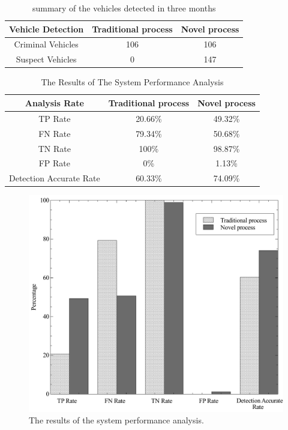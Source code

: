 \begin{table}[!t]
\renewcommand{\arraystretch}{1.2}
\caption{summary of the vehicles detected in three months}
\label{table_vehiclesDetected}
\centering
\begin{tabular}{c|c|c}
\hline
\bfseries Vehicle Detection & \bfseries Traditional process & \bfseries Novel process\\
\hline
Criminal Vehicles & 106 & 106\\
\hline
Suspect Vehicles & 0 & 147\\
\hline
\end{tabular}
\end{table}

\begin{table}[!t]
\renewcommand{\arraystretch}{1.2}
\caption{The Results of The System Performance Analysis}
\label{table_results}
\centering
\begin{tabular}{c|c|c}
\hline
\bfseries Analysis Rate & \bfseries Traditional process & \bfseries Novel process\\
\hline
TP Rate & 20.66\% & 49.32\%\\
\hline
FN Rate & 79.34\% & 50.68\%\\
\hline
TN Rate & 100\% & 98.87\%\\
\hline
FP Rate & 0\% & 1.13\%\\
\hline
Detection Accurate Rate & 60.33\% & 74.09\%\\
\hline
\end{tabular}
\end{table}

\begin{figure}
\centering
\includegraphics[width=1\textwidth]{images/results.pdf}
\caption{The results of the system performance analysis.}
\label{fig:graphresults}
\end{figure}


